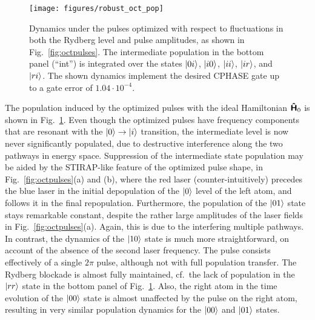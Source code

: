 \begin{figure}[htb]
  \centering
  \texttt{[image: figures/robust\_oct\_pop]}
  \caption{%
  Dynamics under the pulses optimized with respect to fluctuations
  in both the Rydberg level and pulse amplitudes, as shown in
  Fig.~\ref{fig:octpulses}.
  The intermediate population in the bottom panel (``int'') is integrated over
  the states $\Ket{0i}$, $\Ket{i0}$, $\Ket{ii}$, $\Ket{ir}$, and $\Ket{ri}$.
  The shown dynamics implement the desired CPHASE gate up to
  a gate error of $1.04\cdot10^{-4}$.}
  \label{fig:octdyn}
\end{figure}
The population induced by the optimized pulses with the ideal Hamiltonian
$\Op{H}_0$ is shown in Fig.~\ref{fig:octdyn}. Even though the optimized pulses
have frequency components that are resonant with the $\Ket{0} \rightarrow
\Ket{i}$ transition, the intermediate level is now never significantly populated, due to
destructive interference along the two pathways in energy
space. Suppression of the intermediate state population may 
be aided by the STIRAP-like feature of the optimized pulse shape, in
Fig.~\ref{fig:octpulses}(a) and (b), where the red laser
(counter-intuitively) precedes the blue laser in the initial depopulation of the
$\Ket{0}$ level of the left atom, and follows it in the final repopulation.
Furthermore, the population of the $\Ket{01}$ state stays remarkable constant, despite
the rather large amplitudes of the laser fields in
Fig.~\ref{fig:octpulses}(a). Again, this is due
to the interfering multiple pathways. In contrast, the dynamics of the
$\Ket{10}$ state is much more straightforward, on account of the absence of
the second laser frequency. The pulse consists effectively of a single $2 \pi$ pulse,
although not with full population transfer.
The Rydberg blockade is almost fully maintained, cf.\ the lack of
population in the $\Ket{rr}$ state in the bottom panel of Fig.~\ref{fig:octdyn}.
Also, the right atom in the time evolution of the $\Ket{00}$ state is almost
unaffected by the pulse on the right atom, resulting in very similar
population dynamics for the $\Ket{00}$ and $\Ket{01}$ states.


